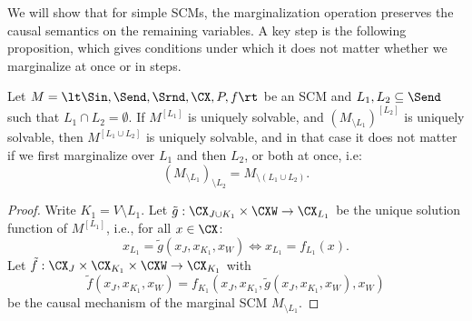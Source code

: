 We will show that for simple SCMs, the marginalization operation preserves the causal semantics on the remaining variables. 
A key step is the following proposition, which gives conditions under which it does not matter whether we marginalize at once or in steps.
\begin{Prp}\label{prp:marginalization_commutes}
  Let $M = \lt \Sin, \Send, \Srnd, \CX, P, f \rt$ be an SCM and $L_1, L_2 \subseteq \Send$ such that $L_1 \cap L_2 = \emptyset$.
  If $M^{[L_1]}$ is uniquely solvable, and
  $(M_{\setminus L_1})^{[L_2]}$ is uniquely solvable, then $M^{[L_1\cup L_2]}$ is uniquely solvable, and in that case it does not matter if we first marginalize over $L_1$ and then $L_2$, or both at once, i.e:
  $$(M_{\setminus L_1})_{\setminus L_2} = M_{\setminus (L_1\cup L_2)}.$$
\end{Prp}
\begin{proof}
  Write $K_1 = V \setminus L_1$.
  Let $\tilde{g} : \CX_{J\cup K_1} \times \CXW \to \CX_{L_1}$ be the unique solution function of $M^{[L_1]}$,
  i.e., for all $x \in \CX$:
  $$x_{L_1} = \tilde{g}(x_J,x_{K_1},x_W) \iff x_{L_1} = f_{L_1}(x).$$
  Let $\tilde{f} : \CX_J \times \CX_{K_1} \times \CXW \to \CX_{K_1}$ with
  $$\tilde{f}(x_J,x_{K_1},x_W) = f_{K_1}(x_J,x_{K_1},\tilde{g}(x_J,x_{K_1},x_W),x_W)$$
  be the causal mechanism of the marginal SCM $M_{\setminus L_1}$.


\end{proof}
